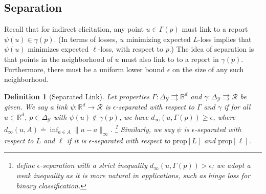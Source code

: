 \documentclass[11pt]{article}
\newcommand{\reals}{\mathbb{R}}
\newcommand{\prop}[1]{\mathrm{prop}[#1]}
\newcommand{\simplex}{\Delta_\Y}
\newcommand{\R}{\mathcal{R}}
\newcommand{\Y}{\mathcal{Y}}
\newcommand{\toto}{\rightrightarrows}
\newtheorem{definition}{Definition}
\begin{document}
\subsection{Separation}

Recall that for indirect elicitation, any point $u \in \Gamma(p)$ must link to a report $\psi(u) \in \gamma(p)$. 
(In terms of losses, $u$ minimizing expected $L$-loss implies that $\psi(u)$ minimizes expected $\ell$-loss, with respect to $p$.)
The idea of separation is that points in the neighborhood of $u$ must also link to to a report in $\gamma(p)$.
Furthermore, there must be a uniform lower bound $\epsilon$ on the size of any such neighborhood.


\begin{definition}[Separated Link]\label{def:sep-link}
  Let properties $\Gamma:\simplex\toto\reals^d$ and $\gamma:\simplex\toto\R$ be given.
  We say a link $\psi:\reals^d\to\R$
  is \emph{$\epsilon$-separated with respect to $\Gamma$ and $\gamma$} if for all $u\in\reals^d$, $p\in\simplex$ with $\psi(u)\notin\gamma(p)$, we have $d_\infty(u,\Gamma(p)) \geq \epsilon$, where $d_\infty(u,A) \doteq \inf_{a\in A} \|u-a\|_\infty$.%
  \footnote{\citet{frongillo2021surrogate} define $\epsilon$-separation with a strict inequality $d_\infty(u,\Gamma(p)) > \epsilon$; we adopt a weak inequality as it is more natural in applications, such as hinge loss for binary classification.}
  Similarly, we say $\psi$ is $\epsilon$-separated with respect to $L$ and $\ell$ if it is $\epsilon$-separated with respect to $\prop{L}$ and $\prop{\ell}$.
\end{definition}
\end{document}
